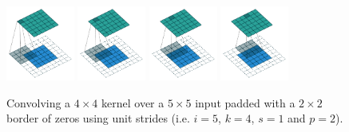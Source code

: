 \documentclass{article}
\begin{document}
\begin{figure}[t]
    \centering
    \includegraphics[width=0.2\textwidth]
        {pdf/arbitrary_padding_no_strides_00.pdf}
    \includegraphics[width=0.2\textwidth]
        {pdf/arbitrary_padding_no_strides_01.pdf}
    \includegraphics[width=0.2\textwidth]
        {pdf/arbitrary_padding_no_strides_02.pdf}
    \includegraphics[width=0.2\textwidth]
        {pdf/arbitrary_padding_no_strides_03.pdf}
    \caption{\label{fig:arbitrary_padding_no_strides} Convolving a $4 \times 4$
        kernel over a $5 \times 5$ input padded with a $2 \times 2$ border of
        zeros using unit strides (i.e. $i = 5$, $k = 4$, $s = 1$ and $p = 2$).}
\end{figure}
\end{document}
